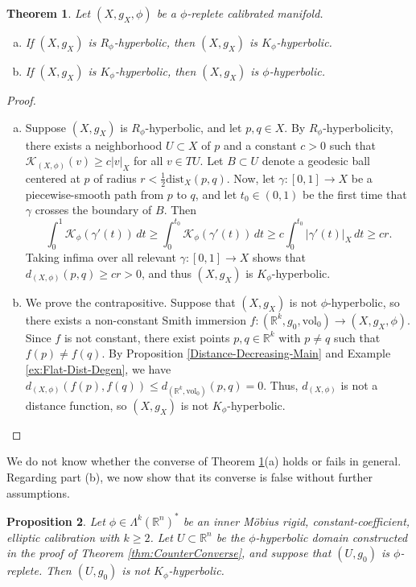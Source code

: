 \documentclass[11pt]{article}
\newcommand{\R}{\mathbb{R}}
\newcommand{\vol}{\mathrm{vol}}
\newtheorem{thm}{Theorem}[section]
\newtheorem{prop}[thm]{Proposition}
\theoremstyle{definition}
\numberwithin{equation}{section}
\begin{document}
\begin{thm} \label{thm:K-implies-Phi} Let $(X, g_X, \phi)$ be a $\phi$-replete calibrated manifold.
\begin{enumerate}[(a)]
\item If $(X, g_X)$ is $R_\phi$-hyperbolic, then $(X, g_X)$ is $K_\phi$-hyperbolic.
\item If $(X, g_X)$ is $K_\phi$-hyperbolic, then $(X, g_X)$ is $\phi$-hyperbolic.
\end{enumerate}
\end{thm}

\begin{proof} ${}$
\begin{enumerate}[(a)]
\item Suppose $(X, g_X)$ is $R_\phi$-hyperbolic, and let $p,q \in X$.  By $R_\phi$-hyperbolicity, there exists a neighborhood $U \subset X$ of $p$ and a constant $c > 0$ such that $\mathcal{K}_{(X,\phi)}(v) \geq c|v|_X$ for all $v \in TU$.  Let $B \subset U$ denote a geodesic ball centered at $p$ of radius $r < \frac{1}{2}\mathrm{dist}_X(p,q)$.  Now, let $\gamma \colon [0,1] \to X$ be a piecewise-smooth path from $p$ to $q$, and let $t_0 \in (0,1)$ be the first time that $\gamma$ crosses the boundary of $B$.  Then
$$\int_0^1 \mathcal{K}_{\phi}(\gamma'(t))\,dt  \geq \int_0^{t_0} \mathcal{K}_\phi(\gamma'(t))\,dt \geq c \int_0^{t_0} |\gamma'(t)|_X\,dt \geq cr.$$
Taking infima over all relevant $\gamma \colon [0,1] \to X$ shows that $d_{(X,\phi)}(p,q) \geq cr > 0$, and thus $(X, g_X)$ is $K_\phi$-hyperbolic. 
\item We prove the contrapositive.  Suppose that $(X,g_X)$ is not $\phi$-hyperbolic, so there exists a non-constant Smith immersion $f \colon (\R^k, g_0, \vol_0) \to (X, g_X, \phi)$.  Since $f$ is not constant, there exist points $p,q \in \R^k$ with $p \neq q$ such that $f(p) \neq f(q)$.  By Proposition \ref{Distance-Decreasing-Main} and Example \ref{ex:Flat-Dist-Degen}, we have $d_{(X,\phi)}( f(p), f(q) ) \leq d_{(\R^k, \vol_0)}(p,q) = 0$.  Thus, $d_{(X,\phi)}$ is not a distance function, so $(X, g_X)$ is not $K_\phi$-hyperbolic.
\end{enumerate}
\end{proof}



 We do not know whether the converse of Theorem \ref{thm:K-implies-Phi}(a) holds or fails in general.  Regarding part (b), we now show that its converse is false without further assumptions.

\begin{prop} Let $\phi \in \Lambda^k(\R^n)^*$ be an inner M\"{o}bius rigid, constant-coefficient, elliptic calibration with $k \geq 2$.  Let $U \subset \R^n$ be the $\phi$-hyperbolic domain constructed in the proof of Theorem \ref{thm:CounterConverse}, and suppose that $(U, g_0)$ is $\phi$-replete.  Then $(U, g_0)$ is not $K_\phi$-hyperbolic.
\end{prop}
\end{document}
